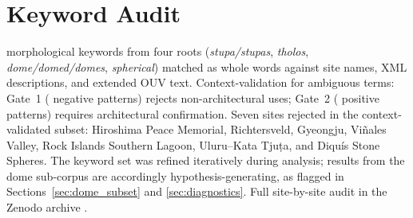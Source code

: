 \documentclass[12pt,a4paper]{article}
\begin{document}
\section{Keyword Audit}
\label{app:keywords}

\NcircKeywords{} morphological keywords from four roots
(\textit{stupa/stupas}, \textit{tholos}, \textit{dome/domed/domes},
\textit{spherical}) matched as whole words against site names, XML
descriptions, and extended OUV text. Context-validation for ambiguous
terms: Gate~1 (\NdomeGateNeg{} negative patterns) rejects
non-architectural uses; Gate~2 (\NdomeGatePos{} positive patterns)
requires architectural confirmation. Seven sites rejected in the
context-validated subset: Hiroshima Peace Memorial, Richtersveld,
Gyeongju, Vi\~{n}ales Valley, Rock Islands Southern Lagoon,
Uluru--Kata Tju\d{t}a, and Diqu\'{i}s Stone Spheres. The keyword set
was refined iteratively during analysis; results from the dome
sub-corpus are accordingly hypothesis-generating, as flagged in
Sections~\ref{sec:dome_subset} and \ref{sec:diagnostics}. Full
site-by-site audit in the Zenodo archive \citep{tenenbaum2026audit}.

\end{document}
